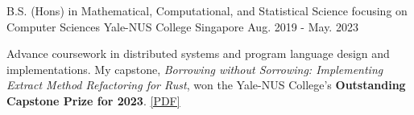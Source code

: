 

\begin{cventries}

  \cventry
    {B.S. (Hons) in Mathematical, Computational, and Statistical Science focusing on Computer Sciences} %
    {Yale-NUS College} %
    {Singapore} %
    {Aug. 2019 - May. 2023} %
    {
     \begin{cvitems} %
       \item {Advance coursework in distributed systems and program language design and implementations.  My capstone, \textit{Borrowing without Sorrowing: Implementing Extract Method Refactoring for Rust}, won the Yale-NUS College's \textbf{Outstanding Capstone Prize for 2023}. \href{https://fastmail-resource.sewenthy.dev/public/academics/bsc_capstone_borrowing_without_sorrowing.pdf}{[PDF]}}
      \end{cvitems}
    }

\end{cventries}

